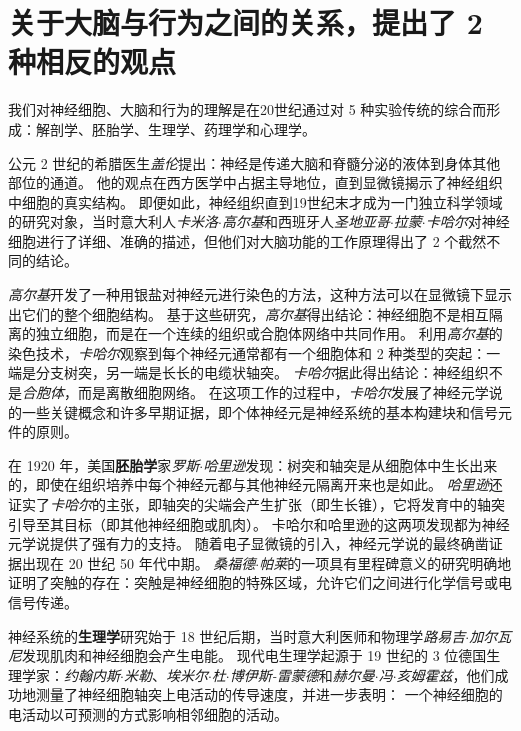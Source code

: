 \section{关于大脑与行为之间的关系，提出了 2 种相反的观点}

我们对神经细胞、大脑和行为的理解是在20世纪通过对 5 种实验传统的综合而形成：解剖学、胚胎学、生理学、药理学和心理学。


公元 2 世纪的希腊医生\textit{盖伦}提出：神经是传递大脑和脊髓分泌的液体到身体其他部位的通道。
他的观点在西方医学中占据主导地位，直到显微镜揭示了神经组织中细胞的真实结构。
即便如此，神经组织直到19世纪末才成为一门独立科学领域的研究对象，当时意大利人\textit{卡米洛$\cdot$高尔基}和西班牙人\textit{圣地亚哥$\cdot$拉蒙$\cdot$卡哈尔}对神经细胞进行了详细、准确的描述，但他们对大脑功能的工作原理得出了 2 个截然不同的结论。


\textit{高尔基}开发了一种用银盐对神经元进行染色的方法，这种方法可以在显微镜下显示出它们的整个细胞结构。
基于这些研究，\textit{高尔基}得出结论：神经细胞不是相互隔离的独立细胞，而是在一个连续的组织或合胞体网络中共同作用。
利用\textit{高尔基}的染色技术，\textit{卡哈尔}观察到每个神经元通常都有一个细胞体和 2 种类型的突起：一端是分支树突，另一端是长长的电缆状轴突。
\textit{卡哈尔}据此得出结论：神经组织不是\textit{合胞体}，而是离散细胞网络。
在这项工作的过程中，\textit{卡哈尔}发展了神经元学说的一些关键概念和许多早期证据，即个体神经元是神经系统的基本构建块和信号元件的原则。


在 1920 年，美国\textbf{胚胎学}家\textit{罗斯$\cdot$哈里逊}发现：树突和轴突是从细胞体中生长出来的，即使在组织培养中每个神经元都与其他神经元隔离开来也是如此。
\textit{哈里逊}还证实了\textit{卡哈尔}的主张，即轴突的尖端会产生扩张（即生长锥），它将发育中的轴突引导至其目标（即其他神经细胞或肌肉）。
卡哈尔和哈里逊的这两项发现都为神经元学说提供了强有力的支持。
随着电子显微镜的引入，神经元学说的最终确凿证据出现在 20 世纪 50 年代中期。
\textit{桑福德$\cdot$帕莱}的一项具有里程碑意义的研究明确地证明了突触的存在：突触是神经细胞的特殊区域，允许它们之间进行化学信号或电信号传递。


神经系统的\textbf{生理学}研究始于 18 世纪后期，当时意大利医师和物理学\textit{路易吉$\cdot$加尔瓦尼}发现肌肉和神经细胞会产生电能。
现代电生理学起源于 19 世纪的 3 位德国生理学家：\textit{约翰内斯$\cdot$米勒}、\textit{埃米尔$\cdot$杜$\cdot$博伊斯-雷蒙德}和\textit{赫尔曼$\cdot$冯$\cdot$亥姆霍兹}，他们成功地测量了神经细胞轴突上电活动的传导速度，并进一步表明：
一个神经细胞的电活动以可预测的方式影响相邻细胞的活动。


